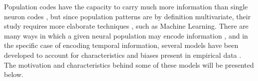     Population codes have the capacity to carry much more information than single neuron codes \cite{hardy2016neurocomputational}, but since population patterns are by definition multivariate, their study requires more elaborate techniques \cite{quiroga2009extracting}, such as Machine Learning. There are many ways in which a given neural population may encode information \cite{quiroga2009extracting, shamir2014emerging, mello2015scalable}, and in the specific case of encoding temporal information, several models have been developed to account for characteristics and biases present in empirical data \cite{hardy2016neurocomputational}. The motivation and characteristics behind some of these models will be presented below.
    